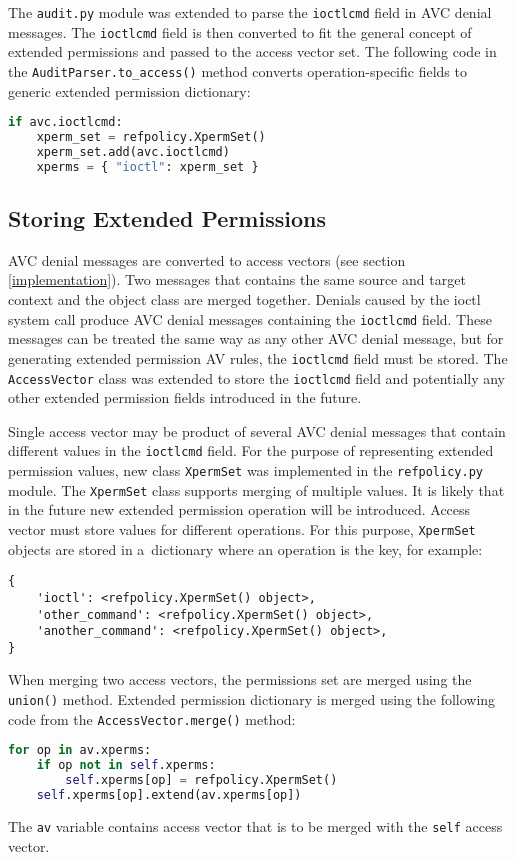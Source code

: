 The \texttt{audit.py} module was extended to parse the \texttt{ioctlcmd} field
in AVC denial messages. The \texttt{ioctlcmd} field is then converted to fit the
general concept of extended permissions and passed to the access vector set. The
following code in the \texttt{AuditParser.to\_access()} method converts
operation-specific fields to generic extended permission dictionary:
\begin{lstlisting}[language=Python]
if avc.ioctlcmd:
    xperm_set = refpolicy.XpermSet()
    xperm_set.add(avc.ioctlcmd)
    xperms = { "ioctl": xperm_set }
\end{lstlisting}

\subsection{Storing Extended Permissions}
AVC denial messages are converted to access vectors (see section
\ref{implementation}). Two messages that contains the same source and target
context and the object class are merged together. Denials caused by the ioctl
system call produce AVC denial messages containing the \texttt{ioctlcmd} field.
These messages can be treated the same way as any other AVC denial message, but
for generating extended permission AV rules, the \texttt{ioctlcmd} field must be
stored. The \texttt{AccessVector} class was extended to store the
\texttt{ioctlcmd} field and potentially any other extended permission fields
introduced in the future.

Single access vector may be product of several AVC denial messages that contain
different values in the \texttt{ioctlcmd} field. For the purpose of representing
extended permission values, new class \texttt{XpermSet} was implemented in the
\texttt{refpolicy.py} module. The \texttt{XpermSet} class supports merging of
multiple values. It is likely that in the future new extended permission
operation will be introduced. Access vector must store values for different
operations. For this purpose, \texttt{XpermSet} objects are stored in
a~dictionary where an operation is the key, for example:
\begin{lstlisting}
{
    'ioctl': <refpolicy.XpermSet() object>,
    'other_command': <refpolicy.XpermSet() object>,
    'another_command': <refpolicy.XpermSet() object>,
}
\end{lstlisting}

When merging two access vectors, the permissions set are merged using the
\texttt{union()} method. Extended permission dictionary is merged using the
following code from the \texttt{AccessVector.merge()} method:
\begin{lstlisting}[language=Python]
for op in av.xperms:
    if op not in self.xperms:
        self.xperms[op] = refpolicy.XpermSet()
    self.xperms[op].extend(av.xperms[op])
\end{lstlisting}
The \texttt{av} variable contains access vector that is to be merged with
the \texttt{self} access vector.


